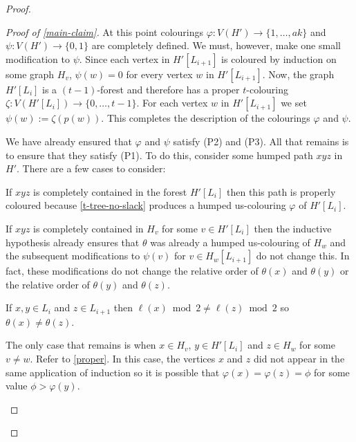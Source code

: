 \documentclass[kpfonts]{patmorin}
\theoremstyle{named}
\begin{document}
\begin{proof}
\begin{proof}[Proof of \cref{main-claim}]
       At this point colourings $\varphi:V(H')\to\{1,\ldots,ak\}$ and $\psi:V(H')\to\{0,1\}$ are completely defined.  We must, however, make one small modification to $\psi$.  Since each vertex in $H'[L_{i+1}]$ is coloured by induction on some graph $H_v$, $\psi(w)=0$ for every vertex $w$ in $H'[L_{i+1}]$.  Now, the graph $H'[L_i]$ is a $(t-1)$-forest and therefore has a proper $t$-colouring $\zeta:V(H'[L_i])\to\{0,\ldots,t-1\}$.  For each vertex $w$ in $H'[L_{i+1}]$ we set $\psi(w):=\zeta(p(w))$.  This completes the description of the colourings $\varphi$ and $\psi$.

       We have already ensured that $\varphi$ and $\psi$ satisfy (P2) and (P3). All that remains is to ensure that they satisfy (P1).  To do this, consider some humped path $xyz$ in $H'$.  There are a few cases to consider:
       \begin{compactenum}
          \item If $xyz$ is completely contained in the forest $H'[L_i]$ then this path is properly coloured because \cref{t-tree-no-slack} produces a humped us-colouring $\varphi$ of $H'[L_i]$.
          \item If $xyz$ is completely contained in $H_v$ for some $v\in H'[L_i]$ then the inductive hypothesis already ensures that $\theta$ was already a humped us-colouring of $H_w$ and the subsequent modifications to $\psi(v)$ for $v\in H_w[L_{i+1}]$ do not change this. In fact, these modifications do not change the relative order of $\theta(x)$ and $\theta(y)$ or the relative order of $\theta(y)$ and $\theta(z)$.
          \item If $x,y\in L_i$ and $z\in L_{i+1}$ then $\ell(x)\bmod 2\neq\ell(z)\bmod 2$ so $\theta(x)\neq\theta(z)$.
          \item The only case that remains is when $x\in H_{v}$, $y\in H'[L_i]$ and $z\in H_w$ for some $v\neq w$. Refer to \cref{proper}.  In this case, the vertices $x$ and $z$ did not appear in the same application of induction so it is possible that $\varphi(x)=\varphi(z)=\phi$ for some value $\phi>\varphi(y)$.


\end{compactenum}
\end{proof}
\end{proof}
\end{document}

